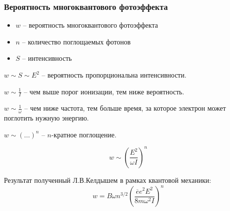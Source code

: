 \documentclass{beamer}
\begin{document}
	\begin{frame}
		\frametitle{Вероятность многоквантового фотоэффекта}
		\begin{itemize}
			\setlength\itemsep{-2pt}
			\item $w$ -- вероятность многоквантового фотоэффекта
			\item $n$ -- количество поглощаемых фотонов
			\item $S$ -- интенсивность
		\end{itemize}
		
		$w \sim S \sim E^2$ -- вероятность пропорциональна интенсивности.
		
		$w \sim \frac{1}{I}$ -- чем выше порог ионизации, тем ниже вероятность.
		
		$w \sim \frac{1}{\omega}$ -- чем ниже частота, тем больше время, за которое электрон может поглотить нужную энергию.

		$w \sim (...)^n$ -- $n$-кратное поглощение.
		
		$$ w \sim \left(\frac{E^2}{\omega I}\right)^n$$
		
		Результат полученный Л.В.Келдышем в рамках квантовой механики:
		\begin{equation}
			w = B \omega n^{3/2} \left(\frac{\overline{e} e^2 E^2}{8m \omega^2 I}\right)^n
		\end{equation}
		
	\end{frame}
	
\end{document}
